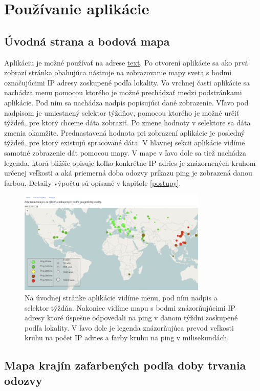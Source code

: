 \chapter{Používanie aplikácie}

\label{kap:pouzivanie}

\section{Úvodná strana a bodová mapa}

Aplikáciu je možné používať na adrese \href{adresa}{text}. Po otvorení aplikácie sa ako prvá zobrazí stránka obahujúca nástroje na 
zobrazovanie mapy sveta s bodmi označujúcimi IP adresy zoskupené podľa lokality. Vo vrchnej časti aplikácie sa nachádza menu pomocou 
ktorého je možné prechádzať medzi podstránkami aplikácie. Pod ním sa nachádza nadpis popisujúci dané zobrazenie. Vľavo pod nadpisom je umiestnený 
selektor týždňov, pomocou ktorého je možné určiť týždeň, pre ktorý chceme dáta zobraziť. Po zmene hodnoty v selektore sa dáta zmenia okamžite. 
Prednastavená hodnota pri zobrazení aplikácie je posledný týždeň, pre ktorý existujú spracované dáta. V hlavnej sekcii aplikácie vidíme samotné 
zobrazenie dát pomocou mapy. V mape v ľavo dole sa tiež nachádza legenda, ktorá bližšie opisuje koľko konkrétne IP adries je znázornených kruhom 
určenej veľkosti a aká priemerná doba odozvy príkazu ping je zobrazená danou farbou. Detaily výpočtu sú opísané v kapitole \ref{postupy}. 

\begin{figure}
    \centerline{\includegraphics[width=0.8\textwidth]{images/map-points}}
    \caption[Úvodná strana s mapou]{Na úvodnej stránke aplikácie vidíme menu, pod ním nadpis a selektor týždňa. Nakoniec vidíme mapu s bodmi 
    znázorňujúcimi IP adresy ktoré úspešne odpovedali na ping v danom týždni zoskupené podľa lokality. V ľavo dole je legenda znázorňujúca prevod veľkosti
    kruhu na počet IP adries a farby kruhu na ping v milisekundách.}
    \label{obr:map-points}
\end{figure}

\section{Mapa krajín zafarbených podľa doby trvania odozvy}

